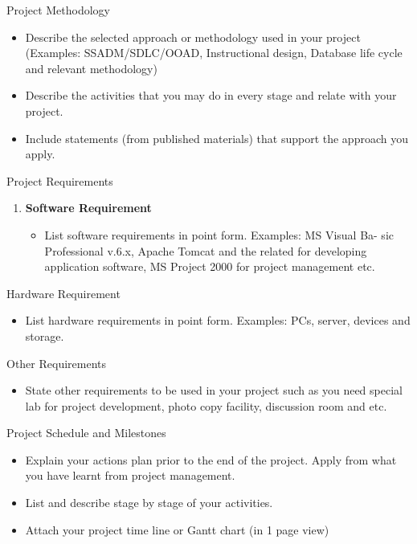 \documentclass[12pt,a4paper]{article}
\begin{document}
Project Methodology

\begin{itemize}
\item
  Describe the selected approach or methodology used in your project
  (Examples: SSADM/SDLC/OOAD, Instructional design, Database life cycle
  and relevant methodology)
\item
  Describe the activities that you may do in every stage and relate with
  your project.
\item
  Include statements (from published materials) that support the
  approach you apply.
\end{itemize}

Project Requirements

\begin{enumerate}
\def\labelenumi{\arabic{enumi}.}
\item
  \textbf{Software Requirement}

  \begin{itemize}
  \item
    List software requirements in point form. Examples: MS Visual Ba-
    sic Professional v.6.x, Apache Tomcat and the related for developing
    application software, MS Project 2000 for project management etc.
  \end{itemize}
\end{enumerate}

Hardware Requirement

\begin{itemize}
\item
  List hardware requirements in point form. Examples: PCs, server,
  devices and storage.
\end{itemize}

Other Requirements

\begin{itemize}
\item
  State other requirements to be used in your project such as you need
  special lab for project development, photo copy facility, discussion
  room and etc.
\end{itemize}

Project Schedule and Milestones

\begin{itemize}
\item
  Explain your actions plan prior to the end of the project. Apply from
  what you have learnt from project management.
\item
  List and describe stage by stage of your activities.
\item
  Attach your project time line or Gantt chart (in 1 page view)
\end{itemize}
\end{document}
